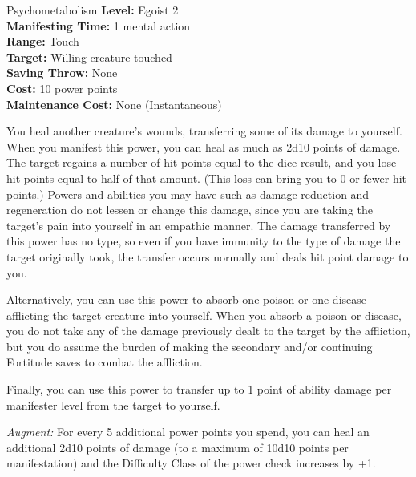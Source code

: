 {Psychometabolism}
{
	\textbf{Level:}
	Egoist 2\\
	\textbf{Manifesting Time:}
	1 mental action\\
	\textbf{Range:}
	Touch\\
	\textbf{Target:}
	Willing creature touched\\
	\textbf{Saving Throw:}
	None\\
	\textbf{Cost:}
	10 power points\\
	\textbf{Maintenance Cost:}
	None (Instantaneous)\\
}
{
	You heal another creature's wounds, transferring some of its damage to yourself. When you manifest this power, you can heal as much as 2d10 points of damage. The target regains a number of hit points equal to the dice result, and you lose hit points equal to half of that amount. (This loss can bring you to 0 or fewer hit points.) Powers and abilities you may have such as damage reduction and regeneration do not lessen or change this damage, since you are taking the target's pain into yourself in an empathic manner. The damage transferred by this power has no type, so even if you have immunity to the type of damage the target originally took, the transfer occurs normally and deals hit point damage to you.

	Alternatively, you can use this power to absorb one poison or one disease afflicting the target creature into yourself. When you absorb a poison or disease, you do not take any of the damage previously dealt to the target by the affliction, but you do assume the burden of making the secondary and/or continuing Fortitude saves to combat the affliction.

	Finally, you can use this power to transfer up to 1 point of ability damage per manifester level from the target to yourself.

	\textit{Augment:} For every 5 additional power points you spend, you can heal an additional 2d10 points of damage (to a maximum of 10d10 points per manifestation) and the Difficulty Class of the power check increases by +1.
}